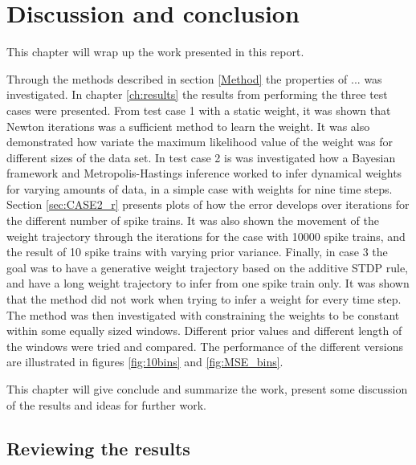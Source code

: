 
\chapter{Discussion and conclusion}
\label{ch:6}

This chapter will wrap up the work presented in this report. 

Through the methods described in section \ref{Method} the properties of ... was investigated. In chapter \ref{ch:results} the results from performing the three test cases were presented. From test case 1 with a static weight, it was shown that Newton iterations was a sufficient method to learn the weight. It was also demonstrated how variate the maximum likelihood value of the weight was for different sizes of the data set. In test case 2 is was investigated how a Bayesian framework and Metropolis-Hastings inference worked to infer dynamical weights for varying amounts of data, in a simple case with weights for nine time steps. Section \ref{sec:CASE2_r} presents plots of how the error develops over iterations for the different number of spike trains. It was also shown the movement of the weight trajectory through the iterations for the case with 10000 spike trains, and the result of 10 spike trains with varying prior variance. Finally, in case 3 the goal was to have a generative weight trajectory based on the additive STDP rule, and have a long weight trajectory to infer from one spike train only. It was shown that the method did not work when trying to infer a weight for every time step. The method was then investigated with constraining the weights to be constant within some equally sized windows. Different prior values and different length of the windows were tried and compared. The performance of the different versions are illustrated in figures \ref{fig:10bins} and \ref{fig:MSE_bins}. 

This chapter will give conclude and summarize the work, present some discussion of the results and ideas for further work. 

\section{Reviewing the results}
\label{sec:review}

